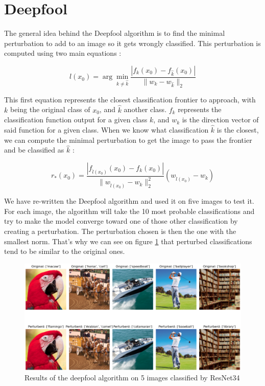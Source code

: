 \documentclass{article}
\begin{document}
\section{Deepfool}

The general idea behind the Deepfool algorithm is to find the minimal perturbation to add to an image so it gets wrongly classified. This perturbation is computed using two main equations :

\begin{equation}
	\hat{l}(x_0) = \arg \min_{k \neq \hat{k}} \frac{|f_{k}(x_0) - f_{\hat{k}}(x_0)|}{\|w_{k} - w_{\hat{k}}\|_2}
\end{equation}

This first equation represents the closest classification frontier to approach, with $k$ being the original class of $x_0$, and $\hat{k}$ another class. $f_k$ represents the classification function output for a given class $k$, and $w_k$ is the direction vector of said function for a given class. When we know what classification $\hat{k}$ is the closest, we can compute the minimal perturbation to get the image to pass the frontier and be classified as $\hat{k}$ :

\begin{equation}
	r_*(x_0) = \frac{|f_{\hat{l}(x_0)}(x_0) - f_k(x_0)|}{\|w_{\hat{l}(x_0)} - w_k\|_2^2} (w_{\hat{l}(x_0)} - w_k)
\end{equation}

We have re-written the Deepfool algorithm and used it on five images to test it. For each image, the algorithm will take the 10 most probable classifications and try to make the model converge toward one of those other classification by creating a perturbation. The perturbation chosen is then the one with the smallest norm. That's why we can see on figure \ref{fig:result_global_deepfool} that perturbed classifications tend to be similar to the original ones.

\begin{figure}[H]
    \centering
    \includegraphics[width=1\linewidth]{results/result_pert_global.png}
    \caption{Results of the deepfool algorithm on 5 images classified by ResNet34}
    \label{fig:result_global_deepfool}
\end{figure}
\end{document}
